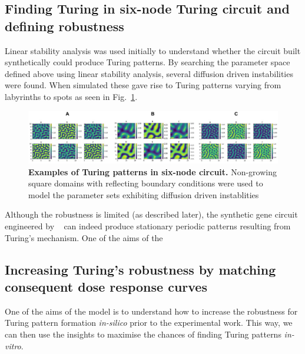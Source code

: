 \subsection{Finding Turing in six-node Turing circuit and defining robustness}
Linear stability analysis was used initially to understand whether the circuit built synthetically could produce Turing patterns.
By searching the parameter space defined above using linear stability analysis, several diffusion driven instabilities were found. When simulated these gave rise to Turing patterns varying from labyrinths to spots as seen in Fig.~\ref{fig:square_turing}.

\begin{figure}[H]
    \centering
    \includegraphics[width=1\textwidth]{chapters/Chapter 2/square_turing}
    \caption[]{\textbf{Examples of Turing patterns in six-node circuit.} Non-growing square domains with reflecting boundary conditions were used to model the parameter sets exhibiting diffusion driven instablities} %
    \label{fig:square_turing}
\end{figure}

Although the robustness is limited (as described later), the synthetic gene circuit engineered by ~\cite{Tica2020} can indeed produce stationary periodic patterns resulting from Turing's mechanism.
One of the aims of the
\subsection{Increasing Turing's robustness by matching consequent dose response curves}
One of the aims of the model is to understand how to increase the robustness for Turing pattern formation \textit{in-silico} prior to the experimental work.
This way, we can then use the insights to maximise the chances of finding Turing patterns \textit{in-vitro}.

